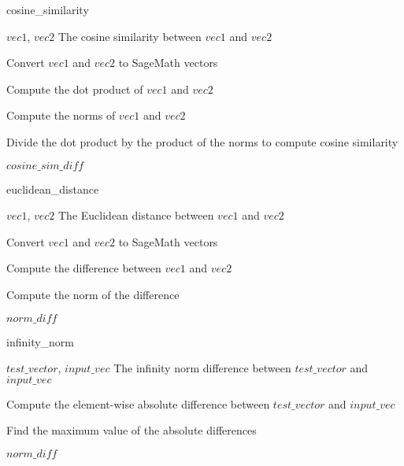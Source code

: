 \documentclass[12pt]{article}
\begin{document}
\begin{algorithm}
    \caption{cosine\_similarity}
    \begin{algorithmic}[1]
        \REQUIRE $vec1$, $vec2$
        \ENSURE The cosine similarity between $vec1$ and $vec2$
    
        \STATE Convert $vec1$ and $vec2$ to SageMath vectors
    
        \STATE Compute the dot product of $vec1$ and $vec2$
    
        \STATE Compute the norms of $vec1$ and $vec2$
    
        \STATE Divide the dot product by the product of the norms to compute cosine similarity
    
        \RETURN $cosine\_sim\_diff$
    
    \end{algorithmic}
\end{algorithm}
    
\begin{algorithm}
    \caption{euclidean\_distance}
    \begin{algorithmic}[1]
        \REQUIRE $vec1$, $vec2$
        \ENSURE The Euclidean distance between $vec1$ and $vec2$
    
        \STATE Convert $vec1$ and $vec2$ to SageMath vectors
    
        \STATE Compute the difference between $vec1$ and $vec2$
    
        \STATE Compute the norm of the difference
    
        \RETURN $norm\_diff$
    
    \end{algorithmic}
\end{algorithm}

\begin{algorithm}
    \caption{infinity\_norm}
    \begin{algorithmic}[1]
        \REQUIRE $test\_vector$, $input\_vec$
        \ENSURE The infinity norm difference between $test\_vector$ and $input\_vec$
    
        \STATE Compute the element-wise absolute difference between $test\_vector$ and $input\_vec$
    
        \STATE Find the maximum value of the absolute differences
    
        \RETURN $norm\_diff$
    
    \end{algorithmic}
\end{algorithm}
\end{document}
